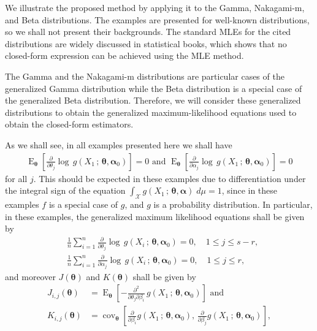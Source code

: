 \documentclass[10pt,a4paper,onecolumn]{article} %
\newcommand{\bs}{\boldsymbol}
\newcommand{\on}{\operatorname}
\begin{document}
We illustrate the proposed method by applying it to the Gamma, Nakagami-m, and Beta distributions. The examples are presented for well-known distributions, so we shall not present their backgrounds. The standard MLEs for the cited distributions are widely discussed in statistical books, which shows that no closed-form expression can be achieved using the MLE method.

The Gamma and the Nakagami-m distributions are particular cases of the generalized Gamma distribution while the Beta distribution is a special case of the generalized Beta distribution. Therefore, we will consider these generalized distributions to obtain the generalized maximum-likelihood equations used to obtain the closed-form estimators. 

As we shall see, in all examples presented here we shall have
\begin{equation}\label{allex}
\begin{aligned}\on{E}_{\bs{\theta}}\left[\frac{\partial}{\partial \theta_j}  \log\, g(X_1\,;\,\bs{\theta},\bs{\alpha}_0)\right] = 0\mbox{ and }
\on{E}_{\bs{\theta}}\left[\frac{\partial}{\partial \alpha_j}  \log\, g(X_1\,;\,\bs{\theta},\bs{\alpha}_0)\right] = 0
\end{aligned}
\end{equation}
for all $j$. This should be expected in these examples due to differentiation under the integral sign of the equation $\int_{\mathcal{X}}  g(X_1\,;\,\bs{\theta},\bs{\alpha})\; d\mu =1$, since in these examples $f$ is a special case of $g$, and $g$ is a probability distribution. In particular, in these examples, the generalized maximum likelihood equations shall be given by
\begin{equation*}
\begin{aligned}
&\frac{1}{n}\sum_{i=1}^n \frac{\partial}{\partial \theta_j}  \log\, g(X_i\,;\,\bs{\theta},\bs{\alpha}_0) = 0,\quad 1\leq j\leq s-r,\\ &\frac{1}{n}
\sum_{i=1}^n \frac{\partial}{\partial \alpha_j}  \log\, g(X_i\,;\,\bs{\theta},\bs{\alpha}_0)=0, \quad  1\leq j\leq r,
\end{aligned}
\end{equation*}
and moreover  $J(\bs{\theta})$ and $K(\bs{\theta})$ shall be given by
 \begin{equation*}
 \begin{aligned}J_{i,j}(\bs{\theta})&=
 \on{E}_{\bs{\theta}} \left[-\frac{\partial^2}{\partial\theta_j\partial \beta_i}\, g(X_1\, ;\, \bs{\theta},\bs{\alpha}_0)\right]\mbox{ and}\\
 K_{i,j}(\bs{\theta}) &=  \on{cov}_{\bs{\theta}} \left[\frac{\partial}{\partial \beta_i} g(X_1\, ;\, \bs{\theta},\bs{\alpha}_0),\,  \frac{\partial}{\partial \beta_j} g(X_1\, ;\, \bs{\theta},\bs{\alpha}_0)\right],
 \end{aligned}
 \end{equation*}
\end{document}
